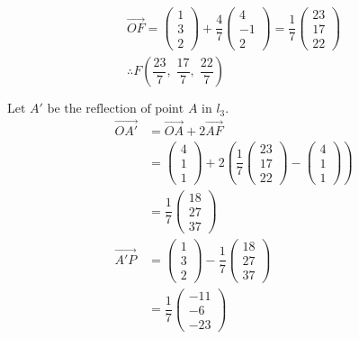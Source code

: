 \documentclass[12pt, a4 paper]{article}
\begin{document}
\begin{outline}[enumerate]
					\[\begin{array}{l}\overrightarrow {OF}  = \left( {\begin{array}{*{20}{c}}1\\3\\2\end{array}} \right) + \dfrac{4}{7}\left( {\begin{array}{*{20}{c}}4\\{ - 1}\\2\end{array}} \right) = \dfrac{1}{7}\left( {\begin{array}{*{20}{c}}{23}\\{17}\\{22}\end{array}} \right)\\\therefore F\left( {\dfrac{{23}}{7},\;\dfrac{{17}}{7},\;\dfrac{{22}}{7}} \right)\end{array}\]
															
					${\textrm{Let }}A'{\textrm{ be the reflection of point }}A{\textrm{ in }}{l_3}.$
					\begin{align*}
						\overrightarrow {OA'} & = \overrightarrow {OA}  + 2\overrightarrow {AF} \\ &= \left( {\begin{array}{*{20}{c}}4\\1\\1\end{array}} \right) + 2\left( {\dfrac{1}{7}\left( {\begin{array}{*{20}{c}}{23}\\{17}\\{22}\end{array}} \right) - \left( {\begin{array}{*{20}{c}}4\\1\\1\end{array}} \right)} \right)\\ &= \dfrac{1}{7}\left( {\begin{array}{*{20}{c}}{18}\\{27}\\{37}\end{array}} \right)\\\overrightarrow {A'P}  &= \left( {\begin{array}{*{20}{c}}1\\3\\2\end{array}} \right) - \dfrac{1}{7}\left( {\begin{array}{*{20}{c}}{18}\\{27}\\{37}\end{array}} \right)\\ &= \dfrac{1}{7}\left( {\begin{array}{*{20}{c}}{ - 11}\\{ - 6}\\{ - 23}\end{array}} \right)
					\end{align*}
										

\end{outline}
\end{document}
